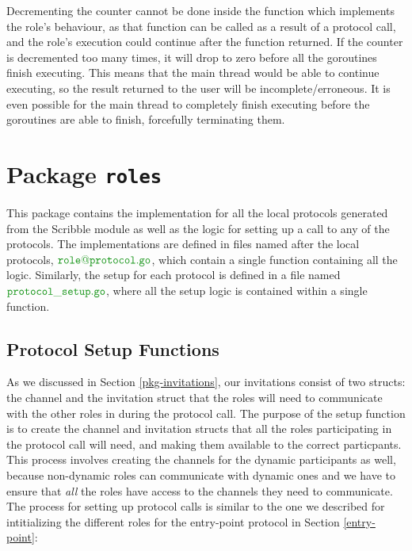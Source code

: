 \documentclass[12pt,twoside]{report}
\begin{document}
Decrementing the counter cannot be done inside the function which implements the role's behaviour, as that function can be called as a result of a protocol call, and the role's execution could continue after the function returned. If the counter is decremented too many times, it will drop to zero before all the goroutines finish executing. This means that the main thread would be able to continue executing, so the result returned to the user will be incomplete/erroneous. It is even possible for the main thread to completely finish executing before the goroutines are able to finish, forcefully terminating them. 


\section{Package \texttt{roles}}\label{pkg-roles}
This package contains the implementation for all the local protocols generated from the Scribble module as well as the logic for setting up a call to any of the protocols. The implementations are defined in files named after the local protocols, $\filename{role@protocol}$, which contain a single function containing all the logic. Similarly, the setup for each protocol is defined in a file named $\filename{protocol\_setup}$, where all the setup logic is contained within a single function.

\subsection{Protocol Setup Functions}
As we discussed in Section \ref{pkg-invitations}, our invitations consist of two structs: the channel and the invitation struct that the roles will need to communicate with the other roles in during the protocol call. The purpose of the setup function is to create the channel and invitation structs that all the roles participating in the protocol call will need, and making them available to the correct particpants. This process involves creating the channels for the dynamic participants as well, because non-dynamic roles can communicate with dynamic ones and we have to ensure that \textit{all} the roles have access to the channels they need to communicate. The process for setting up protocol calls is similar to the one we described for intitializing the different roles for the entry-point protocol in Section \ref{entry-point}:
\end{document}
